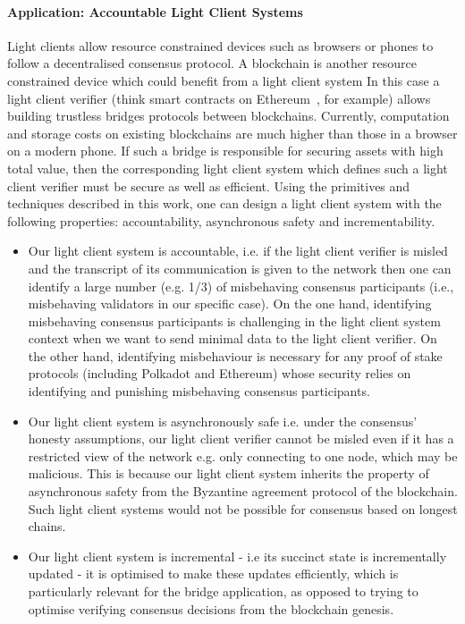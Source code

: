 \paragraph{Application: Accountable Light Client Systems} %
Light clients allow resource constrained devices such as browsers or phones to follow a decentralised 
consensus protocol. A blockchain is another resource constrained device which could benefit from a light client system In this case a light client verifier (think smart contracts on 
Ethereum~\cite{ethereum}, for example) allows building trustless bridges protocols between blockchains. %
Currently, computation and storage 
costs on existing blockchains are much higher than those in a browser on a modern phone. If such a bridge is responsible for securing assets with high total value, 
then the corresponding light client system which defines such a light client verifier must be secure as well as efficient. Using the primitives and techniques described in this work, 
one can design a light client system with the following properties: accountability, asynchronous safety and incrementability.  

\begin{itemize}
\item Our light client system is accountable, i.e. if the light client verifier is misled and the transcript of its communication is given to the network then one 
can identify a large number (e.g. 1/3) of misbehaving consensus participants (i.e., misbehaving validators in our specific case). On the one hand, 
identifying misbehaving consensus participants 
is challenging in the light client system context when we want to send minimal data to the light client verifier. On the other hand, 
identifying misbehaviour is necessary for any proof of stake protocols (including Polkadot and Ethereum) 
whose security relies on identifying and punishing misbehaving consensus participants. 
\item Our light client system is asynchronously safe i.e. under the consensus' honesty assumptions, our light client verifier cannot be misled 
even if it has a restricted view of the network e.g. only connecting to one node, which may be malicious. This is because our light client system 
inherits the property of asynchronous safety from the Byzantine agreement 
protocol of the blockchain. Such light client systems would not be possible for consensus based on longest chains.  
\item Our light client system is incremental - i.e its succinct state is incrementally updated - it is optimised to make these updates efficiently, 
which is particularly relevant for the bridge application, as opposed to trying to optimise verifying consensus decisions from the blockchain genesis.
\end{itemize}

